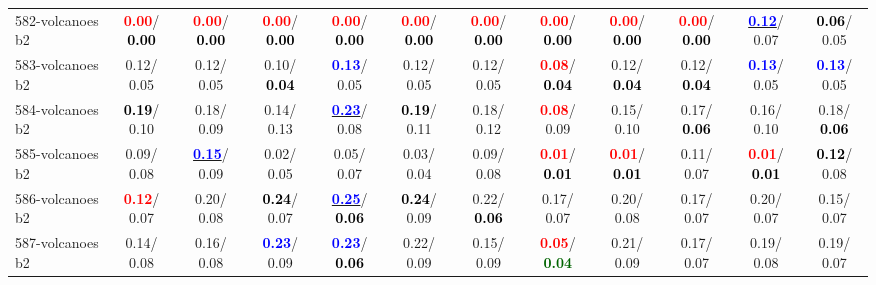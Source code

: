 \begin{table}[h]
\begin{center}
{\begin{tabular}{lc|c|c|c|c|c|c|c|c|c|c}
582-volcanoes b2 & \textcolor{red}{\textbf{  0.00}}/\textcolor{black}{\textbf{  0.00}} & \textcolor{red}{\textbf{  0.00}}/\textcolor{black}{\textbf{  0.00}} & \textcolor{red}{\textbf{  0.00}}/\textcolor{black}{\textbf{  0.00}} & \textcolor{red}{\textbf{  0.00}}/\textcolor{black}{\textbf{  0.00}} & \textcolor{red}{\textbf{  0.00}}/\textcolor{black}{\textbf{  0.00}} & \textcolor{red}{\textbf{  0.00}}/\textcolor{black}{\textbf{  0.00}} & \textcolor{red}{\textbf{  0.00}}/\textcolor{black}{\textbf{  0.00}} & \textcolor{red}{\textbf{  0.00}}/\textcolor{black}{\textbf{  0.00}} & \textcolor{red}{\textbf{  0.00}}/\textcolor{black}{\textbf{  0.00}} & \underline{\textcolor{blue}{\textbf{  0.12}}}/  0.07 & \textcolor{black}{\textbf{  0.06}}/  0.05 \\
583-volcanoes b2 &   0.12/  0.05 &   0.12/  0.05 &   0.10/\textcolor{black}{\textbf{  0.04}} & \textcolor{blue}{\textbf{  0.13}}/  0.05 &   0.12/  0.05 &   0.12/  0.05 & \textcolor{red}{\textbf{  0.08}}/\textcolor{black}{\textbf{  0.04}} &   0.12/\textcolor{black}{\textbf{  0.04}} &   0.12/\textcolor{black}{\textbf{  0.04}} & \textcolor{blue}{\textbf{  0.13}}/  0.05 & \textcolor{blue}{\textbf{  0.13}}/  0.05 \\ \hline
584-volcanoes b2 & \textcolor{black}{\textbf{  0.19}}/  0.10 &   0.18/  0.09 &   0.14/  0.13 & \underline{\textcolor{blue}{\textbf{  0.23}}}/  0.08 & \textcolor{black}{\textbf{  0.19}}/  0.11 &   0.18/  0.12 & \textcolor{red}{\textbf{  0.08}}/  0.09 &   0.15/  0.10 &   0.17/\textcolor{black}{\textbf{  0.06}} &   0.16/  0.10 &   0.18/\textcolor{black}{\textbf{  0.06}} \\
585-volcanoes b2 &   0.09/  0.08 & \underline{\textcolor{blue}{\textbf{  0.15}}}/  0.09 &   0.02/  0.05 &   0.05/  0.07 &   0.03/  0.04 &   0.09/  0.08 & \textcolor{red}{\textbf{  0.01}}/\textcolor{black}{\textbf{  0.01}} & \textcolor{red}{\textbf{  0.01}}/\textcolor{black}{\textbf{  0.01}} &   0.11/  0.07 & \textcolor{red}{\textbf{  0.01}}/\textcolor{black}{\textbf{  0.01}} & \textcolor{black}{\textbf{  0.12}}/  0.08 \\
586-volcanoes b2 & \textcolor{red}{\textbf{  0.12}}/  0.07 &   0.20/  0.08 & \textcolor{black}{\textbf{  0.24}}/  0.07 & \underline{\textcolor{blue}{\textbf{  0.25}}}/\textcolor{black}{\textbf{  0.06}} & \textcolor{black}{\textbf{  0.24}}/  0.09 &   0.22/\textcolor{black}{\textbf{  0.06}} &   0.17/  0.07 &   0.20/  0.08 &   0.17/  0.07 &   0.20/  0.07 &   0.15/  0.07 \\
587-volcanoes b2 &   0.14/  0.08 &   0.16/  0.08 & \textcolor{blue}{\textbf{  0.23}}/  0.09 & \textcolor{blue}{\textbf{  0.23}}/\textcolor{black}{\textbf{  0.06}} &   0.22/  0.09 &   0.15/  0.09 & \textcolor{red}{\textbf{  0.05}}/\textcolor{darkgreen}{\textbf{  0.04}} &   0.21/  0.09 &   0.17/  0.07 &   0.19/  0.08 &   0.19/  0.07 \\

\end{tabular}}
\end{center}
\end{table}
